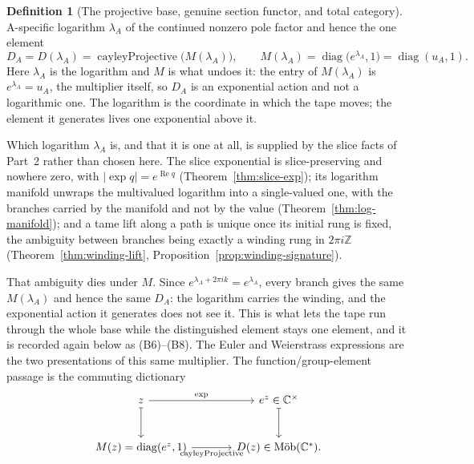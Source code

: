 \documentclass[11pt]{article}
\newcommand{\CC}{\mathbb{C}}
\newcommand{\ZZ}{\mathbb{Z}}
\theoremstyle{plain}
\theoremstyle{definition}
\newtheorem{definition}[theorem]{Definition}
\theoremstyle{remark}
\begin{document}
\begin{definition}[The projective base, genuine section functor, and total category]
A-specific logarithm $\lambda_A$ of the continued nonzero pole factor and hence the one element
\[
  D_A=D(\lambda_A)=\operatorname{cayleyProjective}\bigl(M(\lambda_A)\bigr),
  \qquad
  M(\lambda_A)=\operatorname{diag}\bigl(e^{\lambda_A},1\bigr)
              =\operatorname{diag}(u_A,1).
\]
Here $\lambda_A$ is the logarithm and $M$ is what undoes it: the entry of
$M(\lambda_A)$ is $e^{\lambda_A}=u_A$, the multiplier itself, so $D_A$ is an
exponential action and not a logarithmic one. The logarithm is the coordinate
in which the tape moves; the element it generates lives one exponential above
it.

Which logarithm $\lambda_A$ is, and that it is one at all, is supplied by the
slice facts of Part~2 rather than chosen here. The slice exponential is
slice-preserving and nowhere zero, with $\lvert\exp q\rvert=e^{\operatorname{Re}q}$
\textup{(}Theorem~\ref{thm:slice-exp}\textup{)}; its logarithm manifold
unwraps the multivalued logarithm into a single-valued one, with the branches
carried by the manifold and not by the value
\textup{(}Theorem~\ref{thm:log-manifold}\textup{)}; and a tame lift along a path
is unique once its initial rung is fixed, the ambiguity between branches being
exactly a winding rung in $2\pi i\ZZ$
\textup{(}Theorem~\ref{thm:winding-lift},
Proposition~\ref{prop:winding-signature}\textup{)}.

That ambiguity dies under $M$. Since $e^{\lambda_A+2\pi ik}=e^{\lambda_A}$,
every branch gives the same $M(\lambda_A)$ and hence the same $D_A$: the
logarithm carries the winding, and the exponential action it generates does not
see it. This is what lets the tape run through the whole base while the
distinguished element stays one element, and it is recorded again below as
\textup{(B6)--(B8)}.
The Euler and Weierstrass expressions are the two presentations of this same multiplier. The
function/group-element passage is the commuting dictionary
\[
\begin{tikzcd}[column sep=large,row sep=large]
z \arrow[r,"\exp"] \arrow[d,mapsto] & e^z\in\CC^\times \arrow[d,mapsto]\\
M(z)=\operatorname{diag}(e^z,1)
  \arrow[r,"\operatorname{cayleyProjective}"'] &
D(z)\in\operatorname{M\ddot ob}(\CC^*).
\end{tikzcd}
\]


\end{definition}
\end{document}
